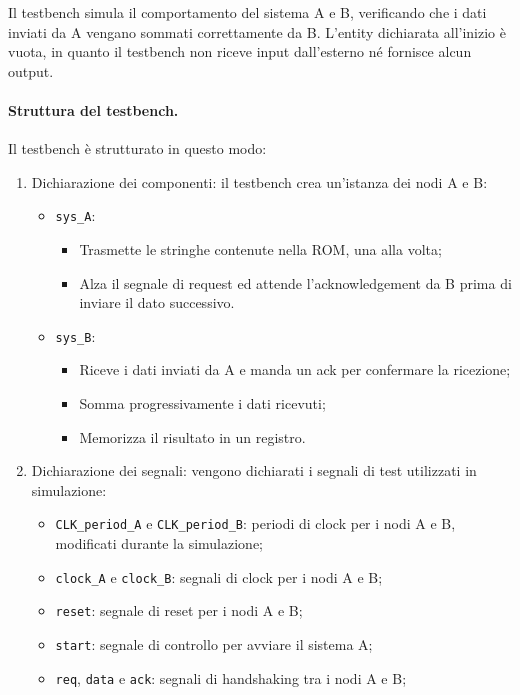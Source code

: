 Il testbench simula il comportamento del sistema A e B, verificando che i dati inviati da A vengano sommati correttamente da B. L'entity dichiarata all'inizio è vuota, in quanto il testbench non riceve input dall'esterno né fornisce alcun output.

\paragraph{Struttura del testbench.}
Il testbench è strutturato in questo modo:

\begin{enumerate}
    \item Dichiarazione dei componenti: il testbench crea un'istanza dei nodi A e B:
    \begin{itemize}
        \item \texttt{sys\_A}:
        \begin{itemize}
            \item Trasmette le stringhe contenute nella ROM, una alla volta;
            \item Alza il segnale di request ed attende l'acknowledgement da B prima di inviare il dato successivo.
        \end{itemize}
        \item \texttt{sys\_B}:
        \begin{itemize}
            \item Riceve i dati inviati da A e manda un ack per confermare la ricezione;
            \item Somma progressivamente i dati ricevuti;
            \item Memorizza il risultato in un registro.
        \end{itemize}
    \end{itemize}
    \item Dichiarazione dei segnali: vengono dichiarati i segnali di test utilizzati in simulazione:
    \begin{itemize}
        \item \texttt{CLK\_period\_A} e \texttt{CLK\_period\_B}: periodi di clock per i nodi A e B, modificati durante la simulazione;
        \item \texttt{clock\_A} e \texttt{clock\_B}: segnali di clock per i nodi A e B;
        \item \texttt{reset}: segnale di reset per i nodi A e B;
        \item \texttt{start}: segnale di controllo per avviare il sistema A;
        \item \texttt{req}, \texttt{data} e \texttt{ack}: segnali di handshaking tra i nodi A e B;

\end{itemize}
\end{enumerate}
